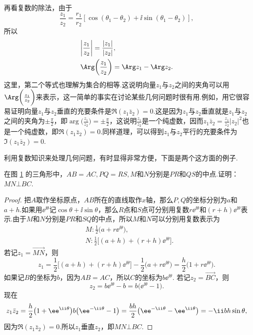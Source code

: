 再看复数的除法，由于
\[\frac{z_1}{z_2}=\frac{r_1}{r_2}[\cos(\theta_1-\theta_2)+\ii\sin(\theta_1-\theta_2)],\]
所以
\begin{align*}
&\bigg|\frac{z_1}{z_2}\bigg|=\frac{|z_1|}{|z_2|},\\
&\Arg\bigg(\frac{z_1}{z_2}\bigg)=\Arg z_1-\Arg z_2.
\end{align*}
这里，第二个等式也理解为集合的相等.这说明向量$z_1$与$z_2$之间的夹角可以用$\Arg \bigg(\frac{z_1}{z_2}\bigg)$来表示，这一简单的事实在讨论某些几何问题时很有用.例如，用它很容易证明向量$z_1$与$z_2$垂直的充要条件是$\Re (z_1\bar z_2)=0$.这是因为$z_1$与$z_2$垂直就是$z_1$与$z_2$之间的夹角为$\pm\frac\pi2$，即$\arg \bigg(\frac{z_1}{z_2}\bigg)=\pm\frac\pi2$，这说明$\frac{z_1}{z_2}$是一个纯虚数，因而$z_1\bar z_2=\frac{z_1}{z_2}|z_2|^2$也是一个纯虚数，即$\Re(z_1\bar z_2)=0$.同样道理，可以得到$z_1$与$z_2$平行的充要条件为$\Im(z_1\bar z_2)=0$.

利用复数知识来处理几何问题，有时显得非常方便，下面是两个这方面的例子.
\begin{example}
在图 \ref{fig1.3} 的三角形中，$AB=AC,PQ=RS,M$和$N$分别是$PR$和$QS$的中点.证明： $MN\bot BC$.
\end{example}
\begin{figure}[!ht]
\centering
{}
\caption{}\label{fig1.3}
\end{figure}
\begin{proof}
把$A$取作坐标原点，$AB$所在的直线取作$x$轴，那么$P,Q$的坐标分别为$a$和$a+h$.如果用$\ee^{\ii\theta} $记$\cos\theta+\ii\sin\theta$，那么$R$点和$S$点可分别用复数$r\ee^{\ii\theta}$和$(r+h)\ee^{\ii\theta}$表示.由于$M$和$N$分别是$PR$和$SQ$的中点，所以$M$和$N$可以分别用复数表示为
\begin{align*}
  &M:\frac12\big(a+r\ee^{\ii\theta}\big),\\
  &N:\frac12\big[(a+h)+(r+h)\ee^{\ii\theta}\big].
\end{align*}
若记$z_1=\overrightarrow{MN}$，则
\[z_1=\frac12\big[(a+h)+(r+h)\ee^{\ii\theta}\big]-\frac12\big(a+r\ee^{\ii\theta}\big)=\frac h2\big(1+r\ee^{\ii\theta}\big).\]
如果记$B$的坐标为$b$，因为$AB=AC$，所以$C$的坐标为$b\ee^{\ii\theta}$. 若记$z_2=\overrightarrow{BC}$，则
\[z_2=b\ee^{\ii\theta}-b=b\big(\ee^{\ii\theta}-1\big).\]
现在
\[
z_1\bar z_2=\frac h2\big(1+\ee^{\ii\theta}\big)b\big(\ee^{-\ii\theta}-1\big)\\
=\frac{bh}2\big(\ee^{-\ii\theta}-\ee^{\ii\theta}\big)=-\ii bh\sin\theta,
\]
因为$\Re(z_1\bar z_2)=0$.所以$z_1$垂直$z_2$，即$MN\bot BC$.
\end{proof}


